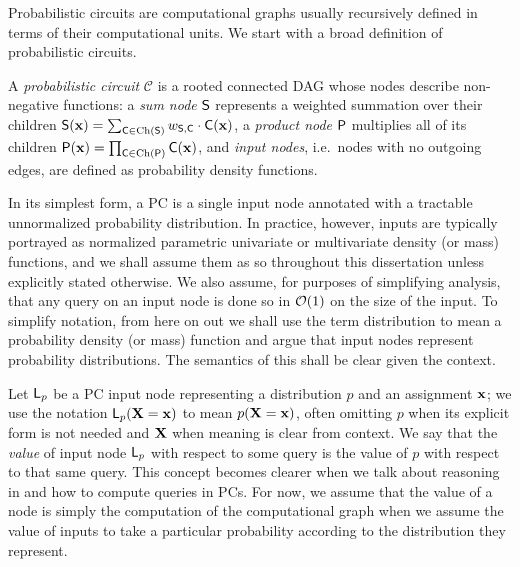 Probabilistic circuits are computational graphs usually recursively defined in terms of their
computational units. We start with a broad definition of probabilistic circuits.

\begin{definition}
  A \emph{probabilistic circuit} $\mathcal{C}$ is a rooted connected DAG whose nodes describe
  non-negative functions: a \emph{sum node} $\operatorname{\textup{\textsf{S}}}$ represents a weighted summation over their children
  $\operatorname{\textup{\textsf{S}}}(\mathbf{x})=\sum_{\operatorname{\textup{\textsf{C}}}\in\operatorname*{\normalfont{Ch}}(\operatorname{\textup{\textsf{S}}})} w_{\operatorname{\textup{\textsf{S}}},\operatorname{\textup{\textsf{C}}}}\cdot\operatorname{\textup{\textsf{C}}}(\mathbf{x})$, a \emph{product
  node} $\operatorname{\textup{\textsf{P}}}$ multiplies all of its children $\operatorname{\textup{\textsf{P}}}(\mathbf{x})=\prod_{\operatorname{\textup{\textsf{C}}}\in\operatorname*{\normalfont{Ch}}(\operatorname{\textup{\textsf{P}}})}
  \operatorname{\textup{\textsf{C}}}(\mathbf{x})$, and \emph{input nodes}, i.e.\ nodes with no outgoing edges, are defined as
  probability density functions.\label{def:pc}
\end{definition}

In its simplest form, a PC is a single input node annotated with a tractable unnormalized
probability distribution. In practice, however, inputs are typically portrayed as normalized
parametric univariate or multivariate density (or mass) functions, and we shall assume them as so
throughout this dissertation unless explicitly stated otherwise. We also assume, for purposes of
simplifying analysis, that any query on an input node is done so in $\mathcal{O}(1)$ on the size of the
input. To simplify notation, from here on out we shall use the term distribution to mean a
probability density (or mass) function and argue that input nodes represent probability
distributions. The semantics of this shall be clear given the context.

Let $\operatorname{\textup{\textsf{L}}}_p$ be a PC input node representing a distribution $p$ and an assignment $\mathbf{x}$; we
use the notation $\operatorname{\textup{\textsf{L}}}_p(\mathbf{X}=\mathbf{x})$ to mean $p(\mathbf{X}=\mathbf{x})$, often omitting $p$ when
its explicit form is not needed and $\mathbf{X}$ when meaning is clear from context. We say that the
\emph{value} of input node $\operatorname{\textup{\textsf{L}}}_p$ with respect to some query is the value of $p$ with respect to
that same query. This concept becomes clearer when we talk about reasoning in  and
how to compute queries in PCs. For now, we assume that the value of a node is simply the
computation of the computational graph when we assume the value of inputs to take a particular
probability according to the distribution they represent.


